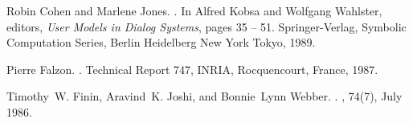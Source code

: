 \documentclass{kluwer}    %
\begin{document}
\begin{article}
\begin{thebibliography}{}
Robin Cohen and Marlene Jones.
.
\newblock In Alfred Kobsa and Wolfgang Wahlster, editors, {\em User Models in
  Dialog Systems}, pages 35 -- 51. Springer-Verlag, Symbolic Computation
  Series, Berlin Heidelberg New York Tokyo, 1989.

Pierre Falzon.
.
\newblock Technical Report 747, INRIA, Rocquencourt, France, 1987.

Timothy~W. Finin, Aravind~K. Joshi, and Bonnie~Lynn Webber.
.
, 74(7), July 1986.

\end{thebibliography}
\end{article}
\end{document}
